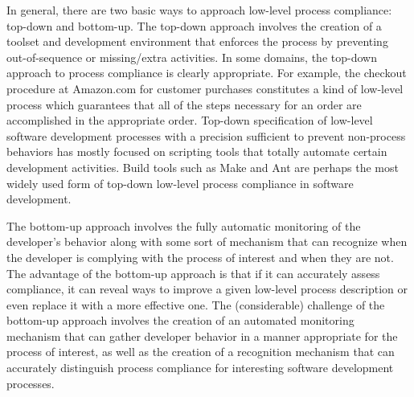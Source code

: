 In general, there are two basic ways to approach low-level process
compliance: top-down and bottom-up.  The top-down approach involves the
creation of a toolset and development environment that enforces the process
by preventing out-of-sequence or missing/extra activities.  In some
domains, the top-down approach to process compliance is clearly
appropriate. For example, the checkout procedure at Amazon.com for customer
purchases constitutes a kind of low-level process which guarantees that all
of the steps necessary for an order are accomplished in the appropriate
order.  Top-down specification of low-level software development processes
with a precision sufficient to prevent non-process behaviors has mostly
focused on scripting tools that totally automate certain development
activities. Build tools such as Make and Ant are perhaps the most widely
used form of top-down low-level process compliance in software development.

The bottom-up approach involves the fully automatic monitoring of the
developer's behavior along with some sort of mechanism that can recognize
when the developer is complying with the process of interest and when they
are not.  The advantage of the bottom-up approach is that if it can
accurately assess compliance, it can reveal ways to improve a given
low-level process description or even replace it with a more effective one. 
The (considerable) challenge of the bottom-up approach involves the creation 
of an automated monitoring mechanism that can gather developer behavior 
in a manner appropriate for the process of interest, as well as the creation
of a recognition mechanism that can accurately distinguish process compliance for
interesting software development processes. 
